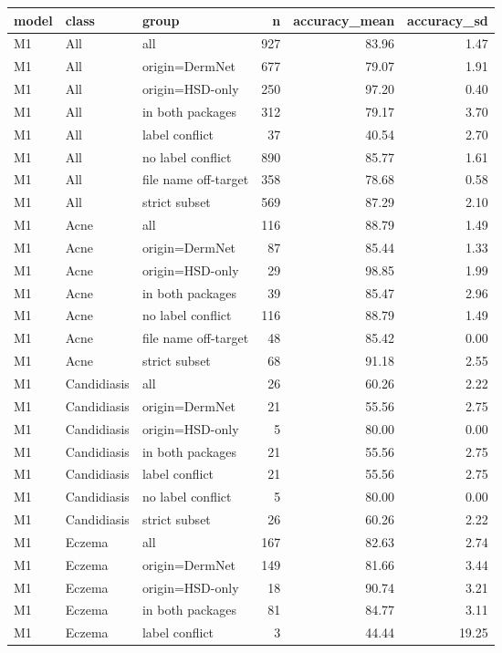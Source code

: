 \begin{tabular}{lllrrr}
\toprule
model & class & group & n & accuracy\_mean & accuracy\_sd \\
\midrule
M1 & All & all & 927 & 83.96 & 1.47 \\
M1 & All & origin=DermNet & 677 & 79.07 & 1.91 \\
M1 & All & origin=HSD-only & 250 & 97.20 & 0.40 \\
M1 & All & in both packages & 312 & 79.17 & 3.70 \\
M1 & All & label conflict & 37 & 40.54 & 2.70 \\
M1 & All & no label conflict & 890 & 85.77 & 1.61 \\
M1 & All & file name off-target & 358 & 78.68 & 0.58 \\
M1 & All & strict subset & 569 & 87.29 & 2.10 \\
M1 & Acne & all & 116 & 88.79 & 1.49 \\
M1 & Acne & origin=DermNet & 87 & 85.44 & 1.33 \\
M1 & Acne & origin=HSD-only & 29 & 98.85 & 1.99 \\
M1 & Acne & in both packages & 39 & 85.47 & 2.96 \\
M1 & Acne & no label conflict & 116 & 88.79 & 1.49 \\
M1 & Acne & file name off-target & 48 & 85.42 & 0.00 \\
M1 & Acne & strict subset & 68 & 91.18 & 2.55 \\
M1 & Candidiasis & all & 26 & 60.26 & 2.22 \\
M1 & Candidiasis & origin=DermNet & 21 & 55.56 & 2.75 \\
M1 & Candidiasis & origin=HSD-only & 5 & 80.00 & 0.00 \\
M1 & Candidiasis & in both packages & 21 & 55.56 & 2.75 \\
M1 & Candidiasis & label conflict & 21 & 55.56 & 2.75 \\
M1 & Candidiasis & no label conflict & 5 & 80.00 & 0.00 \\
M1 & Candidiasis & strict subset & 26 & 60.26 & 2.22 \\
M1 & Eczema & all & 167 & 82.63 & 2.74 \\
M1 & Eczema & origin=DermNet & 149 & 81.66 & 3.44 \\
M1 & Eczema & origin=HSD-only & 18 & 90.74 & 3.21 \\
M1 & Eczema & in both packages & 81 & 84.77 & 3.11 \\
M1 & Eczema & label conflict & 3 & 44.44 & 19.25 \\

\end{tabular}
